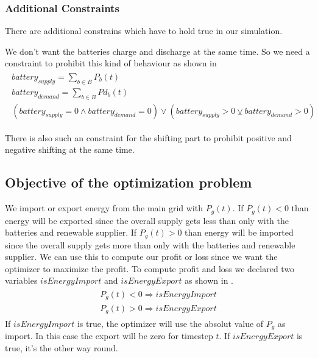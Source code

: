 \subsubsection{Additional Constraints}
There are additional constrains which have to hold true in our simulation.

We don't want the batteries charge and discharge at the same time.
So we need a constraint to prohibit this kind of behaviour as shown in 
\begin{align} \label{eq:batteryConstraint}
\begin{split}
battery_{supply} = \sum\limits_{b\in B} P_{b}(t)\\
battery_{demand} = \sum\limits_{b\in B} Pd_{b}(t)\\
(battery_{supply} = 0 \wedge battery_{demand} = 0 ) \vee (battery_{supply} > 0 \veebar battery_{demand} > 0)
\end{split}
\end{align}

There is also such an constraint for the shifting part to prohibit positive and negative shifting at the same time.

\subsection{Objective of the optimization problem}
We import or export energy from the main grid with $P_{g}(t)$.
If $P_{g}(t) < 0$ than energy will be exported since the overall supply gets less than only with the batteries and renewable supplier.
If $P_{g}(t) > 0$ than energy will be imported since the overall supply gets more than only with the batteries and renewable supplier.
We can use this to compute our profit or loss since we want the optimizer to maximize the profit.
To compute profit and loss we declared two variables $isEnergyImport$ and $isEnergyExport$ as shown in .
\begin{align} \label{eq:importexport}
\begin{split}
P_{g}(t) < 0 \Rightarrow isEnergyImport\\
P_{g}(t) > 0 \Rightarrow isEnergyExport
\end{split}
\end{align}
If $isEnergyImport$ is true, the optimizer will use the absolut value of $P_{g}$ as import.
In this case the export will be zero for timestep $t$.
If $isEnergyExport$ is true, it's the other way round.


